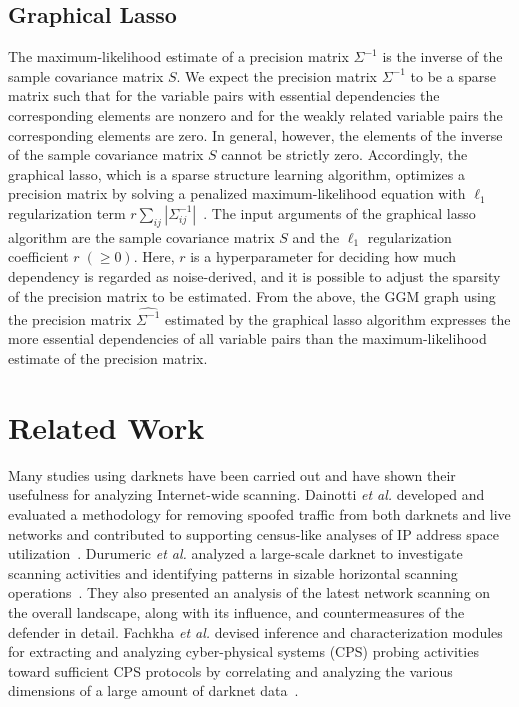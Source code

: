 \documentclass[conference]{IEEEtran}
\begin{document}
\subsection{Graphical Lasso}
The maximum-likelihood estimate of a precision matrix $\Sigma^{-1}$ is the inverse of the sample covariance matrix $S$.
We expect the precision matrix $\Sigma^{-1}$ to be a sparse matrix such that for the variable pairs with essential dependencies the corresponding elements are nonzero and for the weakly related variable pairs the corresponding elements are zero.
In general, however, the elements of the inverse of the sample covariance matrix $S$ cannot be strictly zero.
Accordingly, the graphical lasso, which is a sparse structure learning algorithm, optimizes a precision matrix by solving a penalized maximum-likelihood equation with $\ell_1$ regularization term $r\sum_{ij}|\Sigma^{-1}_{ij}|$~\cite{Friedman}.
The input arguments of the graphical lasso algorithm are the sample covariance matrix $S$ and the $\ell_1$ regularization coefficient $r\;(\geq 0)$.
Here, $r$ is a hyperparameter for deciding how much dependency is regarded as noise-derived, and it is possible to adjust the sparsity of the precision matrix to be estimated.
From the above, the GGM graph using the precision matrix $\hat{\Sigma^{-1}}$ estimated by the graphical lasso algorithm expresses the more essential dependencies of all variable pairs than the maximum-likelihood estimate of the precision matrix.



\section{Related Work}
Many studies using darknets have been carried out and have shown their usefulness for analyzing Internet-wide scanning.
Dainotti \textit{et al.} developed and evaluated a methodology for removing spoofed traffic from both darknets and live networks and contributed to supporting census-like analyses of IP address space utilization~\cite{Dainotti}.
Durumeric \textit{et al.} analyzed a large-scale darknet to investigate scanning activities and identifying patterns in sizable horizontal scanning operations~\cite{Durumeric}.
They also presented an analysis of the latest network scanning on the overall landscape, along with its influence, and countermeasures of the defender in detail.
Fachkha \textit{et al.} devised inference and characterization modules for extracting and analyzing cyber-physical systems (CPS) probing activities toward sufficient CPS protocols by correlating and analyzing the various dimensions of a large amount of darknet data~\cite{Fachkha}.
\end{document}
